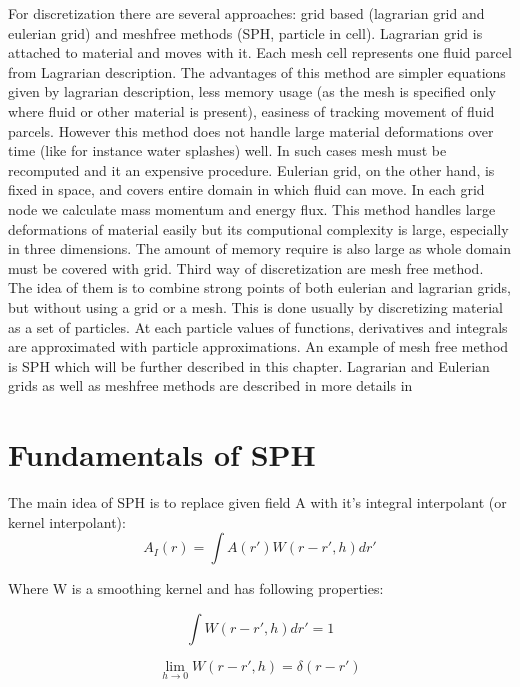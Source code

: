 For discretization there are several approaches: grid based (lagrarian grid and eulerian grid) and meshfree methods (SPH, particle in cell).
Lagrarian grid is attached to material and moves with it. Each mesh cell represents one fluid parcel from Lagrarian description. The advantages of this method are simpler equations given by lagrarian description, less memory usage (as the mesh is specified only where fluid or other material is present), easiness of tracking movement of fluid parcels. However this method does not handle large material deformations over time (like for instance water splashes) well. In such cases mesh must be recomputed and it an expensive procedure.
Eulerian grid, on the other hand, is fixed in space, and covers entire domain in which fluid can move. In each grid node we calculate mass momentum and energy flux. This method handles large deformations of material easily but its computional complexity is large, especially in three dimensions. The amount of memory require is also large as whole domain must be covered with grid. 
Third way of discretization are mesh free method. The idea of them is to combine strong points of both eulerian and lagrarian grids, but without using a grid or a mesh. This is done usually by discretizing material as a set of particles. At each particle values of functions, derivatives and integrals are approximated with particle approximations. An example of mesh free method is SPH which will be further described in this chapter. 
Lagrarian and Eulerian grids as well as meshfree methods are described in more details in \cite[chapter 1]{Liu}

\section{Fundamentals of SPH}

The main idea of SPH is to replace given field A with it's integral interpolant (or kernel interpolant):
\begin{equation}
\label{eq:sph_kernel_interpolant}
A_I(r) = \int A(r')W(r - r', h)dr'
\end{equation}

Where W is a smoothing kernel and has following properties:

\begin{equation}
\label{eq:sph_kernel_property_1}
\int W(r - r', h)dr' = 1
\end{equation}

\begin{equation}
\label{eq:sph_kernel_property_2}
\lim_{h \to 0}W(r - r', h) = \delta(r-r')
\end{equation}

